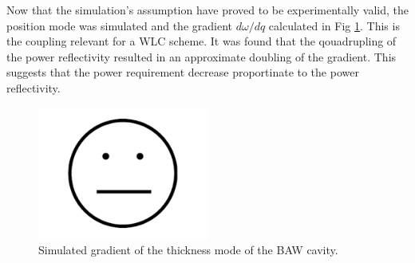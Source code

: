 \documentclass[aps,  
                a4paper, 
                amsmath, 
                amssymb, 
                preprint,
                tightenlines,  
                amsfonts,
                nofootinbib,
                onecolumn,
                titlepage,
                10pt
            ]{revtex4-2}
\begin{document}
    \par
    Now that the simulation's assumption have proved to be experimentally valid, the position mode was simulated and the gradient $d\omega/dq$ calculated in Fig \ref{fig:gradient-dmim}. This is the coupling relevant for a WLC scheme. It was found that the qouadrupling of the power reflectivity resulted in an approximate doubling of the gradient. This suggests that the power requirement decrease proportinate to the power reflectivity. 
    \begin{figure}
        \centering
        \includegraphics[width=0.5\textwidth]{img/blank.png}
        \caption{Simulated gradient of the thickness mode of the BAW cavity.}
        \label{fig:gradient-dmim}
    \end{figure}
\end{document}
